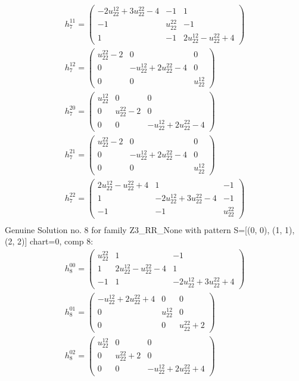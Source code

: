 \documentclass[a4paper, 11pt, twoside, onecolumn]{article}
\begin{document}
\begin{landscape}
\begin{gather*}
	 h_7^{11}=\begin{pmatrix}- 2 u^{12}_{22} + 3 u^{22}_{22} - 4 & -1 & 1\\-1 & u^{22}_{22} & -1\\1 & -1 & 2 u^{12}_{22} - u^{22}_{22} + 4\end{pmatrix}\\ 
	 h_7^{12}=\begin{pmatrix}u^{22}_{22} - 2 & 0 & 0\\0 & - u^{12}_{22} + 2 u^{22}_{22} - 4 & 0\\0 & 0 & u^{12}_{22}\end{pmatrix}\\ 
	 h_7^{20}=\begin{pmatrix}u^{12}_{22} & 0 & 0\\0 & u^{22}_{22} - 2 & 0\\0 & 0 & - u^{12}_{22} + 2 u^{22}_{22} - 4\end{pmatrix}\\ 
	 h_7^{21}=\begin{pmatrix}u^{22}_{22} - 2 & 0 & 0\\0 & - u^{12}_{22} + 2 u^{22}_{22} - 4 & 0\\0 & 0 & u^{12}_{22}\end{pmatrix}\\ 
	 h_7^{22}=\begin{pmatrix}2 u^{12}_{22} - u^{22}_{22} + 4 & 1 & -1\\1 & - 2 u^{12}_{22} + 3 u^{22}_{22} - 4 & -1\\-1 & -1 & u^{22}_{22}\end{pmatrix}\\ 
\end{gather*} 
Genuine Solution no. 8 for family Z3_RR_None with pattern S=[(0, 0), (1, 1), (2, 2)] chart=0, comp 8: 
\begin{gather*} 
	 h_8^{00}=\begin{pmatrix}u^{22}_{22} & 1 & -1\\1 & 2 u^{12}_{22} - u^{22}_{22} - 4 & 1\\-1 & 1 & - 2 u^{12}_{22} + 3 u^{22}_{22} + 4\end{pmatrix}\\ 
	 h_8^{01}=\begin{pmatrix}- u^{12}_{22} + 2 u^{22}_{22} + 4 & 0 & 0\\0 & u^{12}_{22} & 0\\0 & 0 & u^{22}_{22} + 2\end{pmatrix}\\ 
	 h_8^{02}=\begin{pmatrix}u^{12}_{22} & 0 & 0\\0 & u^{22}_{22} + 2 & 0\\0 & 0 & - u^{12}_{22} + 2 u^{22}_{22} + 4\end{pmatrix}\\ 

\end{gather*}
\end{landscape}
\end{document}
